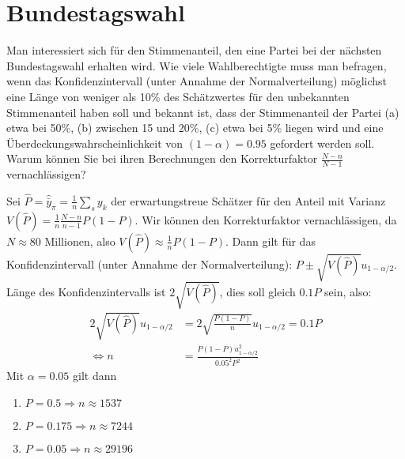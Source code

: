 \documentclass{article}
\begin{document}
\section{Bundestagswahl}
Man interessiert sich für den Stimmenanteil, den eine Partei bei der nächsten Bundestagswahl erhalten wird. Wie viele Wahlberechtigte muss man befragen, wenn das Konfidenzintervall (unter Annahme der Normalverteilung) möglichst eine Länge von weniger als 10\% des Schätzwertes für den unbekannten Stimmenanteil haben soll und bekannt ist, dass der Stimmenanteil der Partei (a) etwa bei 50\%, (b) zwischen 15 und 20\%, (c) etwa bei 5\% liegen wird und eine Überdeckungswahrscheinlichkeit von $(1-\alpha)=0.95$ gefordert werden soll. Warum können Sie bei ihren Berechnungen den Korrekturfaktor $\frac{N-n}{N-1}$ vernachlässigen?
\begin{solution}
Sei $\hat{P}=\hat{\bar{y}}_\pi=\frac{1}{n}\sum_s y_k$ der erwartungstreue Schätzer für den Anteil mit Varianz $V(\hat{P}) = \frac{1}{n} \frac{N-n}{n-1}P(1-P) $. Wir können den Korrekturfaktor vernachlässigen, da $N\approx 80$ Millionen, also  $V(\hat{P}) \approx \frac{1}{n}P(1-P)$. Dann gilt für das Konfidenzintervall (unter Annahme der Normalverteilung): $P \pm \sqrt{V(\hat{P})} u_{1-\alpha/2}$. Länge des Konfidenzintervalls ist $2 \sqrt{V(\hat{P})}$, dies soll gleich $0.1 P$ sein, also:
\begin{align*}
2 \sqrt{V(\hat{P})} u_{1-\alpha/2} &= 2 \sqrt{\frac{P(1-P)}{n}}u_{1-\alpha/2}=0.1P\\
\Leftrightarrow n &= \frac{P(1-P)u_{1-\alpha/2}^2}{0.05^2 P^2}
\end{align*}
Mit $\alpha=0.05$ gilt dann 
\begin{enumerate}
	\item $P=0.5 \Rightarrow n \approx 1537$
	\item $P=0.175 \Rightarrow n \approx 7244$
	\item $P=0.05 \Rightarrow n \approx 29196$
\end{enumerate}
\end{solution}
\end{document}

